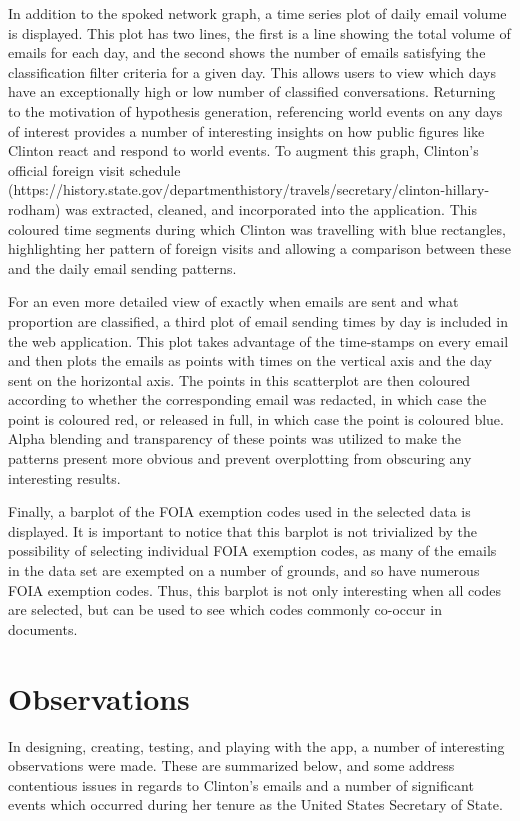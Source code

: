 \documentclass[journal]{vgtc}                %
\begin{document}
In addition to the spoked network graph, a time series plot of daily email volume is displayed. This plot has two lines, the first is a line showing the total volume of emails for each day, and the second shows the number of emails satisfying the classification filter criteria for a given day. This allows users to view which days have an exceptionally high or low number of classified conversations. Returning to the motivation of hypothesis generation, referencing world events on any days of interest provides a number of interesting insights on how public figures like Clinton react and respond to world events. To augment this graph, Clinton's official foreign visit schedule (https://history.state.gov/departmenthistory/travels/secretary/clinton-hillary-rodham) was extracted, cleaned, and incorporated into the application. This coloured time segments during which Clinton was travelling with blue rectangles, highlighting her pattern of foreign visits and allowing a comparison between these and the daily email sending patterns.

For an even more detailed view of exactly when emails are sent and what proportion are classified, a third plot of email sending times by day is included in the web application. This plot takes advantage of the time-stamps on every email and then plots the emails as points with times on the vertical axis and the day sent on the horizontal axis. The points in this scatterplot are then coloured according to whether the corresponding email was redacted, in which case the point is coloured red, or released in full, in which case the point is coloured blue. Alpha blending and transparency of these points was utilized to make the patterns present more obvious and prevent overplotting from obscuring any interesting results. 

Finally, a barplot of the FOIA exemption codes used in the selected data is displayed. It is important to notice that this barplot is not trivialized by the possibility of selecting individual FOIA exemption codes, as many of the emails in the data set are exempted on a number of grounds, and so have numerous FOIA exemption codes. Thus, this barplot is not only interesting when all codes are selected, but can be used to see which codes commonly co-occur in documents.

\section{Observations}

In designing, creating, testing, and playing with the app, a number of interesting observations were made. These are summarized below, and some address contentious issues in regards to Clinton's emails and a number of significant events which occurred during her tenure as the United States Secretary of State.
\end{document}
